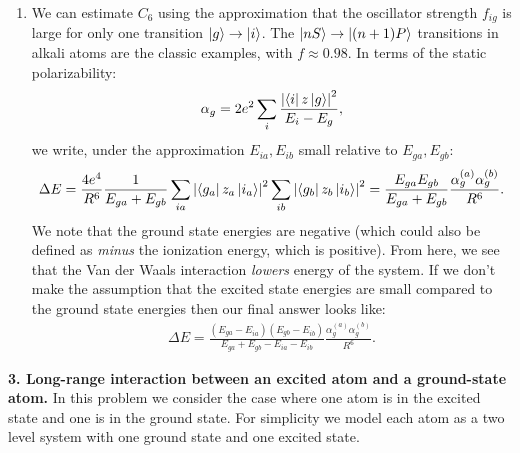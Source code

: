 \documentclass{article}
\theoremstyle{definition}
\newcommand{\al}{\alpha}
\newcommand{\f}[2]{\frac{#1}{#2}}
\begin{document}
\begin{enumerate}[label=(\alph*)]
\item We can estimate $C_6$ using the approximation that the oscillator strength $f_{ig}$ is large for only one transition $\ket{g} \to \ket{i}$. The $\ket{nS} \to \ket{(n+1)P}$ transitions in alkali atoms are the classic examples, with $f \approx 0.98$. In terms of the static polarizability:
\begin{align*}
\al_g = 2e^2 \sum_i \f{\abs{ \bra{i}z \ket{g} }^2}{E_i - E_g},
\end{align*}
we write, under the approximation $E_{ia}, E_{ib}$ small relative to $E_{ga}, E_{gb}$:
\begin{align*}
\Delta E 
= 
\f{ 4e^4 }{R^6} \f{1}{E_{ga} + E_{gb}} 
\sum_{ia} \abs{ \bra{g_a} z_a \ket{i_a}}^2   \sum_{ib} \abs{ \bra{g_b} z_b \ket{i_b}}^2 
=  \f{E_{ga}E_{gb}}{E_{ga} + E_{gb}} 
\f{\al_g^{(a)} \al_g^{(b)}}{R^6}.
\end{align*}
We note that the ground state energies are negative (which could also be defined as \textit{minus} the ionization energy, which is positive). From here, we see that the Van der Waals interaction \textit{lowers} energy of the system. If we don't make the assumption that the excited state energies are small compared to the ground state energies then our final answer looks like:
\begin{align*}
\Delta E = \f{(E_{ga} - E_{ia})(E_{gb} - E_{ib})}{E_{ga} + E_{gb} - E_{ia} - E_{ib}}   
\f{\al_g^{(a)} \al_g^{(b)}}{R^6}.
\end{align*}



\end{enumerate}



\noindent \textbf{3. Long-range interaction between an excited atom and a ground-state atom.} In this problem we consider the case where one atom is in the excited state and one is in the ground state. For simplicity we model each atom as a two level system with one ground state and one excited state. 
\end{document}
